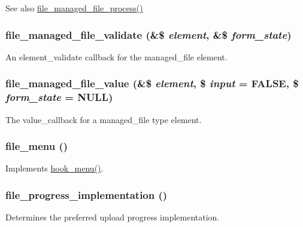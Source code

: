 \begin{DoxySeeAlso}{See also}
\hyperlink{file_8module_a1e1b9d0cfae09221706106e984a1b18c}{file\_\-managed\_\-file\_\-process()} 
\end{DoxySeeAlso}
\hypertarget{file_8module_adf68e5c79852aee513af71c70f5bc511}{
\subsubsection[{file\_\-managed\_\-file\_\-validate}]{\setlength{\rightskip}{0pt plus 5cm}file\_\-managed\_\-file\_\-validate (\&\$ {\em element}, \/  \&\$ {\em form\_\-state})}}
\label{file_8module_adf68e5c79852aee513af71c70f5bc511}
An element\_\-validate callback for the managed\_\-file element. \hypertarget{file_8module_a9cb9afc76f5078ef555e93a0513ae90f}{
\subsubsection[{file\_\-managed\_\-file\_\-value}]{\setlength{\rightskip}{0pt plus 5cm}file\_\-managed\_\-file\_\-value (\&\$ {\em element}, \/  \$ {\em input} = {\ttfamily FALSE}, \/  \$ {\em form\_\-state} = {\ttfamily NULL})}}
\label{file_8module_a9cb9afc76f5078ef555e93a0513ae90f}
The value\_\-callback for a managed\_\-file type element. \hypertarget{file_8module_acf2d37bd1c1db6d3b8632a615bd40226}{
\subsubsection[{file\_\-menu}]{\setlength{\rightskip}{0pt plus 5cm}file\_\-menu ()}}
\label{file_8module_acf2d37bd1c1db6d3b8632a615bd40226}
Implements \hyperlink{group__hooks_ga5c95244fea59b25666e409759e133ded}{hook\_\-menu()}. \hypertarget{file_8module_af97cd48da26f5ab56503fa1218a11a04}{
\subsubsection[{file\_\-progress\_\-implementation}]{\setlength{\rightskip}{0pt plus 5cm}file\_\-progress\_\-implementation ()}}
\label{file_8module_af97cd48da26f5ab56503fa1218a11a04}
Determines the preferred upload progress implementation.


